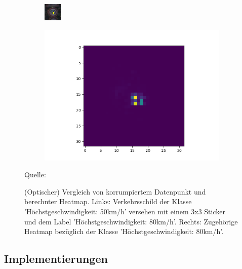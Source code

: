 \documentclass[11pt,a4paper]{article}
\newcommand{\source}[1]{\caption*{\hfill Quelle: {#1}} }
\numberwithin{equation}{section}
\begin{document}
	\begin{figure}
		\centering
		\begin{subfigure}{.5\textwidth}
			\centering
			\includegraphics[width=.4\linewidth]{1450_poison}
			
		\end{subfigure}%
		\begin{subfigure}{.5\textwidth}
			\centering
			\includegraphics[width=.7\linewidth]{1450_poison_lrp.png}
			
		\end{subfigure}
		\caption[(Optischer) Vergleich von korrumpiertem Datenpunkt und berechnter Heatmap.]{(Optischer) Vergleich von korrumpiertem Datenpunkt und berechnter Heatmap. Links: Verkehrsschild der Klasse 'Höchstgeschwindigkeit: 50km/h' versehen mit einem 3x3 Sticker und dem Label 'Höchstgeschwindigkeit: 80km/h'. Rechts: Zugehörige Heatmap bezüglich der Klasse 'Höchstgeschwindigkeit: 80km/h'.}
		\source{\cite{AC}}
		
		\label{vergleich_original_lrp}
	\end{figure}
	\subsection{Implementierungen}
	
\end{document}
